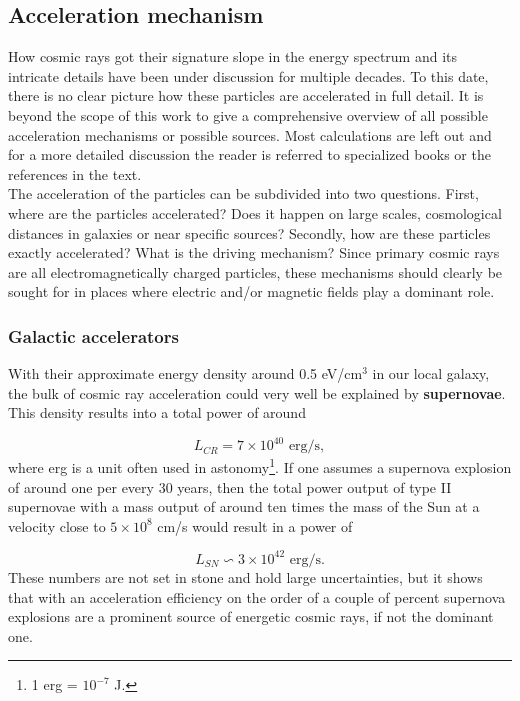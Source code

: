 \subsection{Acceleration mechanism}
How cosmic rays got their signature slope in the energy spectrum and its intricate details have been under discussion for multiple decades. To this date, there is no clear picture how these particles are accelerated in full detail. It is beyond the scope of this work to give a comprehensive overview of all possible acceleration mechanisms or possible sources. Most calculations are left out and for a more detailed discussion the reader is referred to specialized books or the references in the text.\\
\newline
The acceleration of the particles can be subdivided into two questions. First, where are the particles accelerated? Does it happen on large scales, cosmological distances in galaxies or near specific sources? Secondly, how are these particles exactly accelerated? What is the driving mechanism? Since primary cosmic rays are all electromagnetically charged particles, these mechanisms should clearly be sought for in places where electric and/or magnetic fields play a dominant role.

\subsubsection{Galactic accelerators}
With their approximate energy density around 0.5 eV/cm$^3$ in our local galaxy, the bulk of cosmic ray acceleration could very well be explained by \textbf{supernovae}. This density results into a total power of around

\begin{equation}
L_{CR} = 7 \times 10^{40} \textrm{ erg/s},
\end{equation}
where erg is a unit often used in astonomy\footnote{1 erg = $10^{-7}$ J.}. If one assumes a supernova explosion of around one per every 30 years, then the total power output of type II supernovae with a mass output of around ten times the mass of the Sun at a velocity close to $5 \times 10^{8}$ cm/s would result in a power of

\begin{equation}
L_{SN} \backsim 3 \times 10^{42} \textrm{ erg/s}.
\end{equation}
These numbers are not set in stone and hold large uncertainties, but it shows that with an acceleration efficiency on the order of a couple of percent supernova explosions are a prominent source of energetic cosmic rays, if not the dominant one.

